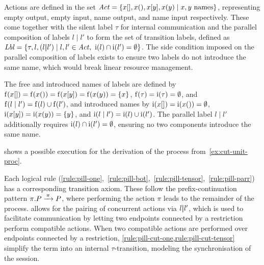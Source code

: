 Actions are defined in the set $\mathit{Act} = \{{{x[]}}, {{x()}}, {{x[y]}}, {{x(y)}} \mid x, y \text{ names}\}$, representing empty output, empty input, name output, and name input respectively. These come together with the silent label $\tau$ for internal communication and the parallel composition of labels $l \mid l'$ to form the set of transition labels, defined as $\mathit{Lbl} = \{\tau, l, ({l{\mathbin{\boldsymbol{|}}}l'}) \mid l, l' \in \mathit{Act},~\operatorname{i}(l) \cap \operatorname{i}(l') = \emptyset\}$. The side condition imposed on the parallel composition of labels exists to ensure two labels do not introduce the same name, which would break linear resource management.

The free and introduced names of labels are defined by $\operatorname{f}(x[]) = \operatorname{f}(x()) = \operatorname{f}(x[y]) = \operatorname{f}(x(y)) = \{x\}$, $\operatorname{f}(\tau) = \operatorname{i}(\tau) = \emptyset$, and $\operatorname{f}(l \mid l') = \operatorname{f}(l) \cup \operatorname{f}(l')$, and introduced names by $\operatorname{i}(x[]) = \operatorname{i}(x()) = \emptyset$, $\operatorname{i}(x[y]) = \operatorname{i}(x(y)) = \{y\}$, and $\operatorname{i}(l \mid l') = \operatorname{i}(l) \cup \operatorname{i}(l')$. The parallel label $l \mid l'$ additionally requires $\operatorname{i}(l) \cap \operatorname{i}(l') = \emptyset$, ensuring no two components introduce the same name.

\begin{example}
   shows a possible execution for the derivation of the process from~\cref{ex:cut-unit-proc}.
\end{example}

Each logical rule (\ref{rule:pill-one},~\ref{rule:pill-bot},~\ref{rule:pill-tensor},~\ref{rule:pill-parr}) has a corresponding transition axiom. These follow the prefix-continuation pattern {$\phl{\prefixed{\pi}{P}} \lto{\pi} \phl{P}$}, where performing the action $\pi$ leads to the remainder of the process.  allows for the pairing of concurrent actions via ${l{\mathbin{\boldsymbol{|}}}l'}$, which is used to facilitate communication by letting two endpoints connected by a restriction perform compatible actions. When two compatible actions are performed over endpoints connected by a restriction, \cref{rule:pill-cut-one,rule:pill-cut-tensor} simplify the term into an internal $\tau$-transition, modeling the synchronisation of the session.

